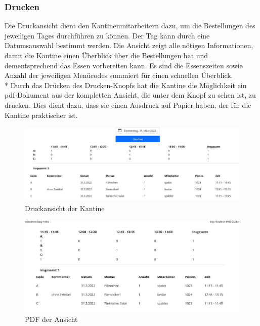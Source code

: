 \subsubsection {Drucken}

Die Druckansicht dient den Kantinenmitarbeitern dazu, um die Bestellungen des jeweiligen Tages durchführen zu können.
Der Tag kann durch eine Datumsauswahl bestimmt werden.
Die Ansicht zeigt alle nötigen Informationen, damit die Kantine einen Überblick über die Bestellungen hat und dementsprechend das Essen vorbereiten kann.
Es sind die Essenszeiten sowie Anzahl der jeweiligen Menücodes summiert für einen schnellen Überblick. \\*
Durch das Drücken des Drucken-Knopfs hat die Kantine die Möglichkeit ein pdf-Dokument aus der kompletten Ansicht, die unter dem Knopf zu sehen ist, zu drucken.
Dies dient dazu, dass sie einen Ausdruck auf Papier haben, der für die Kantine praktischer ist.

\begin{figure}[htp]
    \centering
    \includegraphics[scale=0.45]{pics/kantine_drucken.JPG}
    \caption{Druckansicht der Kantine}
    \label{fig:impl:CantinePrint}
\end{figure}

\begin{figure}[htp]
    \centering
    \includegraphics[scale=0.45]{pics/pdf_ansicht.JPG}
    \caption{PDF der Ansicht}
    \label{fig:impl:CantinePrintPDF}
\end{figure}
\pagebreak

